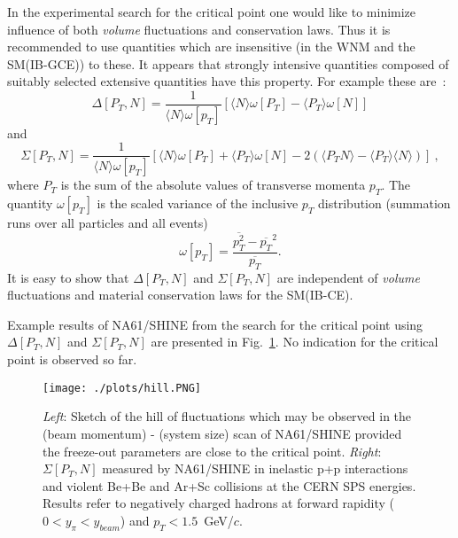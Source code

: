 \documentclass{PoS}
\begin{document}
In the experimental search for the critical point one would like to minimize influence of both \textit{volume} fluctuations 
and conservation laws. Thus it is recommended to use quantities which are insensitive (in the WNM and the SM(IB-GCE)) to these.
It appears that strongly intensive quantities composed of suitably selected extensive quantities have this property.
For example these are~\cite{siq,Gazdzicki:2013ana}:
\begin{equation}
\Delta[P_{T},N] =
\frac {1}{\langle N \rangle \omega[p_{T}]}[\langle N \rangle \omega[P_{T}] - 
\langle P_{T} \rangle \omega[N]]
\label{eq:delta1}
\end{equation}
%
and
%
\begin{equation}
\Sigma[P_{T},N] =
\frac{1}{\langle N \rangle \omega[p_{T}]}[\langle N \rangle \omega[P_{T}] +
\langle P_{T} \rangle \omega[N] - 2(\langle P_{T}N \rangle - 
\langle P_{T} \rangle \langle N \rangle )]\ ,
\label{eq:sigma1}
\end{equation}
%
where $P_{T}$ is the sum of the absolute
values of transverse momenta $p_{T}$. 
The quantity $\omega[p_{T}]$ is the scaled variance of
the inclusive $p_{T}$ distribution (summation runs over all particles and all events)
%
\begin{equation}
\omega[p_{T}] =
\frac{\overline{p_{T}^2} - \overline{p_{T}}^2}{\overline{p_{T}}}.
\end{equation}
It is easy to show that
$\Delta[P_{T},N]$ and $\Sigma[P_{T},N]$ are independent of \textit{volume} fluctuations and material conservation laws for the SM(IB-CE).

Example results of NA61/SHINE from the search for the critical point using $\Delta[P_{T},N]$ and $\Sigma[P_{T},N]$
are presented in Fig.~\ref{fig:hill}. No indication for the critical point is observed so far.

\begin{figure}[h]
	\centering
	\texttt{[image: ./plots/hill.PNG]}
	\caption[]
	{
    \textit{Left}: Sketch of the hill of fluctuations which may be observed in the (beam momentum) - (system size) scan of
    NA61/SHINE provided the freeze-out parameters are close to the critical point.
    \textit{Right}: $\Sigma[P_{T},N]$ measured by NA61/SHINE in inelastic p+p interactions and violent Be+Be and Ar+Sc collisions
    at the CERN SPS energies. Results refer to negatively charged hadrons at forward rapidity ($0 < y_{\pi} < y_{beam}$) 
    and $p_T < 1.5$~GeV/$c$.
	}
	\label{fig:hill}
\end{figure}
\end{document}
